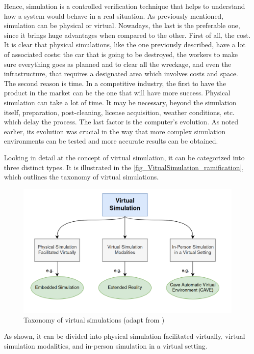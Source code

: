 Hence, simulation is a controlled verification technique that helps to understand how a system would behave in a real situation. As previously 
mentioned, simulation can be physical or virtual. Nowadays, the last is the preferable one, since it brings huge advantages when compared to the 
other. First of all, the cost. It is clear that physical simulations, like the one previously described, have a lot of associated costs: the car 
that is going to be destroyed, the workers to make sure everything goes as planned and to clear all the wreckage, and even the infrastructure, 
that requires a designated area which involves costs and space. The second reason is time. In a competitive industry, the first to have the 
product in the market can be the one that will have more success. Physical simulation can take a lot of time. It may be necessary, beyond the 
simulation itself, preparation, post-cleaning, license acquisition, weather conditions, etc. which delay the process. The last factor is the 
computer's evolution. As noted earlier, its evolution was crucial in the way that more complex simulation environments can be tested and 
more accurate results can be obtained.

Looking in detail at the concept of virtual simulation, it can be categorized into three distinct types. It is illustrated in 
the  \autoref{fig_VitualSimulation_ramification}, which outlines the taxonomy of virtual simulations. 

\begin{figure}[H]
	\centering
 	\includegraphics[width=0.7\linewidth]{Images/VitualSimulation_ramification.png}
 	\caption{Taxonomy of virtual simulations (adapt from \cite{verkuyl2022virtual})}
	 \label{fig_VitualSimulation_ramification}
\end{figure}


As shown, it can be divided into physical simulation facilitated virtually, virtual simulation modalities, and in-person simulation in a 
virtual setting. 

